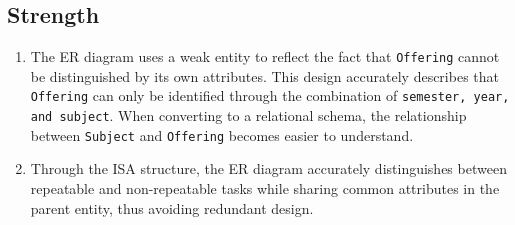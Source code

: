 \documentclass[a4paper,12pt]{article}
\begin{document}
\subsection*{Strength}
    \begin{enumerate}
        \item The ER diagram uses a weak entity to reflect the fact that \texttt{Offering} cannot be distinguished by its own attributes. This design accurately describes that \texttt{Offering} can only be identified through the combination of \texttt{semester, year, and subject}. When converting to a relational schema, the relationship between \texttt{Subject} and \texttt{Offering} becomes easier to understand.

        \item Through the ISA structure, the ER diagram accurately distinguishes between repeatable and non-repeatable tasks while sharing common attributes in the parent entity, thus avoiding redundant design. 

    \end{enumerate}
\end{document}
